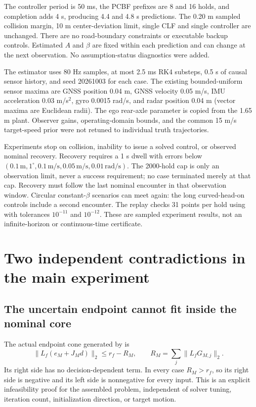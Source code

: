 \documentclass[11pt]{article}
\begin{document}
The controller period is 50 ms, the PCBF prefixes are 8 and 16 holds, and
completion adds 4 s, producing 4.4 and 4.8 s predictions. The 0.20 m sampled
collision margin, 10 m center-deviation limit, single CLF and single controller
are unchanged. There are no road-boundary constraints or executable backup
controls. Estimated $A$ and $\beta$ are fixed within each prediction and can
change at the next observation. No assumption-status diagnostics were added.

The estimator uses 80 Hz samples, at most 2.5 ms RK4 substeps, 0.5 s of causal
sensor history, and seed 20261003 for each case. The existing bounded-uniform
sensor maxima are GNSS position 0.04 m, GNSS velocity 0.05 m/s, IMU acceleration
0.03 m/s$^2$, gyro 0.0015 rad/s, and radar position 0.04 m (vector maxima are
Euclidean radii). The ego rear-axle parameter is copied from the 1.65 m plant.
Observer gains, operating-domain bounds, and the common 15 m/s target-speed
prior were not retuned to individual truth trajectories.

Experiments stop on collision, inability to issue a solved control, or observed
nominal recovery. Recovery requires a 1 s dwell with errors below
$(0.1\,\mathrm m,1^\circ,0.1\,\mathrm{m/s},0.05\,\mathrm{m/s},0.01\,\mathrm{rad/s})$.
The 2000-hold cap is only an observation limit, never a success requirement;
no case terminated merely at that cap. Recovery must follow the last nominal
encounter in that observation window. Circular constant-$\beta$ scenarios can
meet again: the long curved-head-on controls include a second encounter.
The replay checks 31 points per hold using  with tolerances
$10^{-11}$ and $10^{-12}$. These are sampled experiment results, not an
infinite-horizon or continuous-time certificate.

\section{Two independent contradictions in the main experiment}
\subsection{The uncertain endpoint cannot fit inside the nominal core}
The actual endpoint cone generated by  is
\[
 \|L_f(e_M+J_Md)\|_2\le r_f-R_M,
 \qquad R_M=\sum_j\|L_fG_{M,j}\|_2.
\]
Its right side has no decision-dependent term. In every case $R_M>r_f$, so
its right side is negative and its left side is nonnegative for every input.
This is an explicit infeasibility proof for the assembled problem, independent
of solver tuning, iteration count, initialization direction, or target motion.
\end{document}
